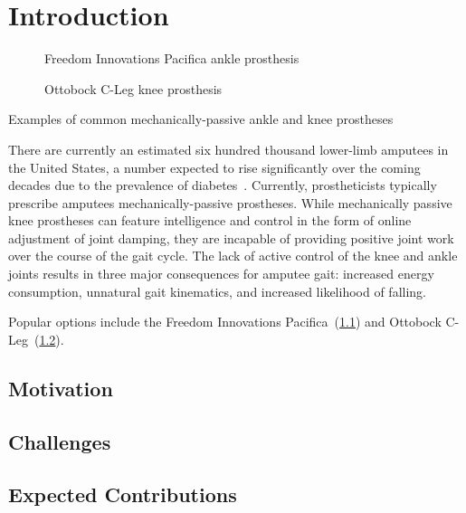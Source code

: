 \chapter{Introduction}

\begin{marginfigure}
	\begin{subfigure}[b]{\textwidth}
    	\centering
        \caption{Freedom Innovations Pacifica ankle prosthesis}
        \label{fig:freedom_innov_pacifica}
        \vspace{0.25in}
	\end{subfigure}
	\begin{subfigure}[b]{\textwidth}
    	\centering
        \caption{Ottobock C-Leg knee prosthesis}
        \label{fig:ottobock_cleg}
	\end{subfigure}
    \caption{Examples of common mechanically-passive ankle and knee prostheses}
\end{marginfigure}


There are currently an estimated six hundred thousand lower-limb amputees in the
United States, a number expected to rise significantly over the coming decades
due to the prevalence of diabetes~\citep{ziegler2008estimating}. Currently, prostheticists typically prescribe amputees mechanically-passive prostheses.  While mechanically passive knee prostheses can feature intelligence and control in the form of online adjustment of joint damping, they are incapable of providing positive joint work over the course of the gait cycle. The lack of active control of the knee and ankle joints results in three major consequences for amputee gait: increased energy consumption, unnatural gait kinematics, and increased likelihood of falling.

Popular options include the Freedom Innovations Pacifica~(\cref{fig:freedom_innov_pacifica}) and Ottobock C-Leg~(\cref{fig:ottobock_cleg}).
\section{Motivation}
\section{Challenges}
\section{Expected Contributions}